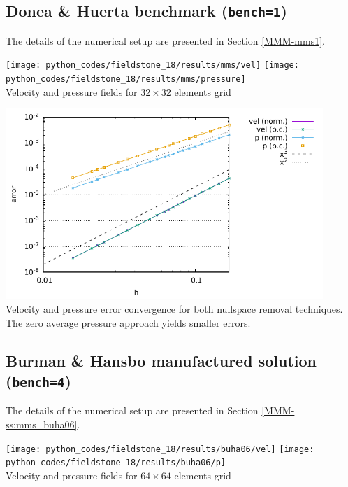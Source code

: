 \subsection*{Donea \& Huerta benchmark ({\tt bench=1})}
The details of the numerical setup are presented in Section \ref{MMM-mms1}.

\begin{center}
\texttt{[image: python\_codes/fieldstone\_18/results/mms/vel]}
\texttt{[image: python\_codes/fieldstone\_18/results/mms/pressure]}\\
{\captionfont Velocity and pressure fields for $32\times 32$ elements grid}
\end{center}

\begin{center}
\includegraphics[width=12cm]{python_codes/fieldstone_18/results/mms/errors}\\
{\captionfont Velocity and pressure error convergence for both nullspace removal 
techniques. The zero average pressure approach yields smaller errors.}
\end{center}

\newpage
\subsection*{Burman \& Hansbo manufactured solution ({\tt bench=4})}

The details of the numerical setup are presented in Section \ref{MMM-ss:mms_buha06}.

\begin{center}
\texttt{[image: python\_codes/fieldstone\_18/results/buha06/vel]}
\texttt{[image: python\_codes/fieldstone\_18/results/buha06/p]}\\
{\captionfont Velocity and pressure fields for $64\times 64$ elements grid}
\end{center}

